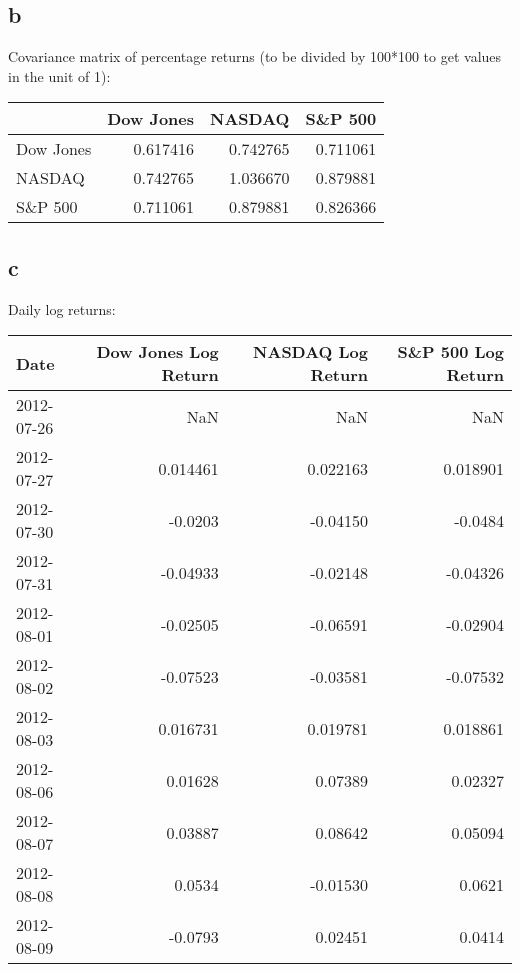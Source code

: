\documentclass{article}
\begin{document}
\subsection{b}
Covariance matrix of percentage returns (to be divided by 100*100 to get values in the unit of 1):

\begin{tabular}{lrrr}
    \toprule
              & Dow Jones & NASDAQ   & S\&P 500 \\
    \midrule
    Dow Jones & 0.617416  & 0.742765 & 0.711061 \\
    NASDAQ    & 0.742765  & 1.036670 & 0.879881 \\
    S\&P 500  & 0.711061  & 0.879881 & 0.826366 \\
    \bottomrule
\end{tabular}

\subsection{c}
Daily log returns:

\begin{tabular}{lrrr}
    \toprule
    Date       & Dow Jones Log Return & NASDAQ Log Return & S\&P 500 Log Return \\
    \midrule
    2012-07-26 & NaN                  & NaN               & NaN                 \\
    2012-07-27 & 0.014461             & 0.022163          & 0.018901            \\
    2012-07-30 & -0.0203              & -0.04150          & -0.0484             \\
    2012-07-31 & -0.04933             & -0.02148          & -0.04326            \\
    2012-08-01 & -0.02505             & -0.06591          & -0.02904            \\
    2012-08-02 & -0.07523             & -0.03581          & -0.07532            \\
    2012-08-03 & 0.016731             & 0.019781          & 0.018861            \\
    2012-08-06 & 0.01628              & 0.07389           & 0.02327             \\
    2012-08-07 & 0.03887              & 0.08642           & 0.05094             \\
    2012-08-08 & 0.0534               & -0.01530          & 0.0621              \\
    2012-08-09 & -0.0793              & 0.02451           & 0.0414              \\
    \bottomrule
\end{tabular}
\end{document}
